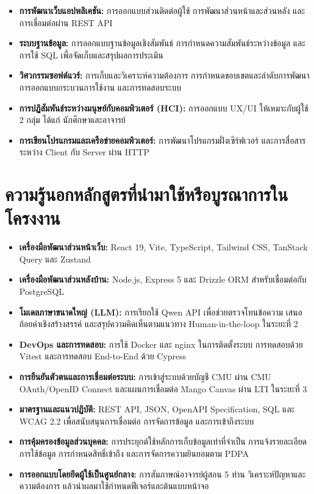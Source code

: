 \begin{itemize}
  \item \textbf{การพัฒนาเว็บแอปพลิเคชัน:} การออกแบบส่วนติดต่อผู้ใช้ การพัฒนาส่วนหน้าและส่วนหลัง และการเชื่อมต่อผ่าน REST API
  \item \textbf{ระบบฐานข้อมูล:} การออกแบบฐานข้อมูลเชิงสัมพันธ์ การกำหนดความสัมพันธ์ระหว่างข้อมูล และการใช้ SQL เพื่อจัดเก็บและสรุปผลการประเมิน
  \item \textbf{วิศวกรรมซอฟต์แวร์:} การเก็บและวิเคราะห์ความต้องการ การกำหนดขอบเขตและลำดับการพัฒนา การออกแบบกระบวนการใช้งาน และการทดสอบระบบ
  \item \textbf{การปฏิสัมพันธ์ระหว่างมนุษย์กับคอมพิวเตอร์ (HCI):} การออกแบบ UX/UI ให้เหมาะกับผู้ใช้ 2 กลุ่ม ได้แก่ นักศึกษาและอาจารย์
  \item \textbf{การเขียนโปรแกรมและเครือข่ายคอมพิวเตอร์:} การพัฒนาโปรแกรมฝั่งเซิร์ฟเวอร์ และการสื่อสารระหว่าง Client กับ Server ผ่าน HTTP
\end{itemize}

\section{ความรู้นอกหลักสูตรที่นำมาใช้หรือบูรณาการในโครงงาน}

\begin{itemize}
  \item \textbf{เครื่องมือพัฒนาส่วนหน้าเว็บ:} React 19, Vite, TypeScript, Tailwind CSS, TanStack Query และ Zustand
  \item \textbf{เครื่องมือพัฒนาส่วนหลังบ้าน:} Node.js, Express 5 และ Drizzle ORM สำหรับเชื่อมต่อกับ PostgreSQL
  \item \textbf{โมเดลภาษาขนาดใหญ่ (LLM):} การเรียกใช้ Qwen API เพื่อช่วยตรวจโทนข้อความ เสนอถ้อยคำเชิงสร้างสรรค์ และสรุปความคิดเห็นตามแนวทาง Human-in-the-loop ในระยะที่ 2
  \item \textbf{DevOps และการทดสอบ:} การใช้ Docker และ nginx ในการติดตั้งระบบ การทดสอบด้วย Vitest และการทดสอบ End-to-End ด้วย Cypress
  \item \textbf{การยืนยันตัวตนและการเชื่อมต่อระบบ:} การเข้าสู่ระบบด้วยบัญชี CMU ผ่าน CMU OAuth/\allowbreak OpenID Connect และแผนการเชื่อมต่อ Mango Canvas ผ่าน LTI ในระยะที่ 3
  \item \textbf{มาตรฐานและแนวปฏิบัติ:} REST API, JSON, OpenAPI Specification, SQL และ WCAG 2.2 เพื่อสนับสนุนการเชื่อมต่อ การจัดการข้อมูล และการเข้าถึงระบบ
  \item \textbf{การคุ้มครองข้อมูลส่วนบุคคล:} การประยุกต์ใช้หลักการเก็บข้อมูลเท่าที่จำเป็น การแจ้งรายละเอียดการใช้ข้อมูล การกำหนดสิทธิ์เข้าถึง และการจัดการความยินยอมตาม PDPA
  \item \textbf{การออกแบบโดยยึดผู้ใช้เป็นศูนย์กลาง:} การสัมภาษณ์อาจารย์ผู้สอน 5 ท่าน วิเคราะห์ปัญหาและความต้องการ แล้วนำผลมาใช้กำหนดฟีเจอร์และต้นแบบหน้าจอ
\end{itemize}
